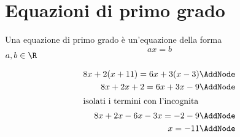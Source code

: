 \section{Equazioni di primo grado}
\label{sec:equazionidiprimogrado}
Una equazione di primo grado è un'equazione della forma \[ax=b\]
$a,b\in\R$
\begin{esempio}
 \begin{NodesList}[margin=3cm]
  \begin{align*}
  8x+2(x+11) = 6x+3(x-3) \AddNode\\
  8x+2x+2  = 6x+3x-9 \AddNode\\
  \intertext{\hfil isolati i termini con l'incognita \hfil}
  8x+2x-6x-3x  = -2-9 \AddNode\\
    x  = -11 \AddNode
  \end{align*}
  \LinkNodes{
    }
  \end{NodesList}
\end{esempio}
%
